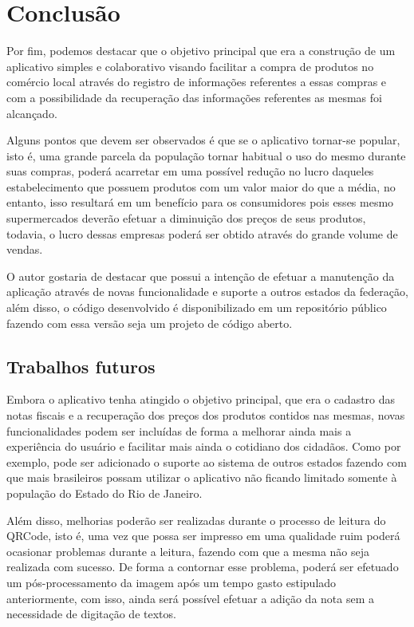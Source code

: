 \chapter{Conclusão}

Por fim, podemos destacar que o objetivo principal que era a construção de um aplicativo simples e colaborativo visando facilitar a compra de produtos no comércio local através do registro de informações referentes a essas compras e com a possibilidade da recuperação das informações referentes as mesmas foi alcançado.

Alguns pontos que devem ser observados é que se o aplicativo tornar-se popular, isto é, uma grande parcela da população tornar habitual o uso do mesmo durante suas compras, poderá acarretar em uma possível redução no lucro daqueles estabelecimento que possuem produtos com um valor maior do que a média, no entanto, isso resultará em um benefício para os consumidores pois esses mesmo supermercados deverão efetuar a diminuição dos preços de seus produtos, todavia, o lucro dessas empresas poderá ser obtido através do grande volume de vendas.

O autor gostaria de destacar que possui a intenção de efetuar a manutenção da aplicação através de novas funcionalidade e suporte a outros estados da federação, além disso, o código desenvolvido é disponibilizado em um repositório público fazendo com essa versão seja um projeto de código aberto.

\section{Trabalhos futuros}

Embora o aplicativo tenha atingido o objetivo principal, que era o cadastro das notas fiscais e a recuperação dos preços dos produtos contidos nas mesmas, novas funcionalidades podem ser incluídas de forma a melhorar ainda mais a experiência do usuário e facilitar mais ainda o cotidiano dos cidadãos. Como por exemplo, pode ser adicionado o suporte ao sistema de outros estados fazendo com que mais brasileiros possam utilizar o aplicativo não ficando limitado somente à população do Estado do Rio de Janeiro.

Além disso, melhorias poderão ser realizadas durante o processo de leitura do QRCode, isto é, uma vez que possa ser impresso em uma qualidade ruim poderá ocasionar problemas durante a leitura, fazendo com que a mesma não seja realizada com sucesso. De forma a contornar esse problema, poderá ser efetuado um pós-processamento da imagem após um tempo gasto estipulado anteriormente, com isso, ainda será possível efetuar a adição da nota sem a necessidade de digitação de textos.

